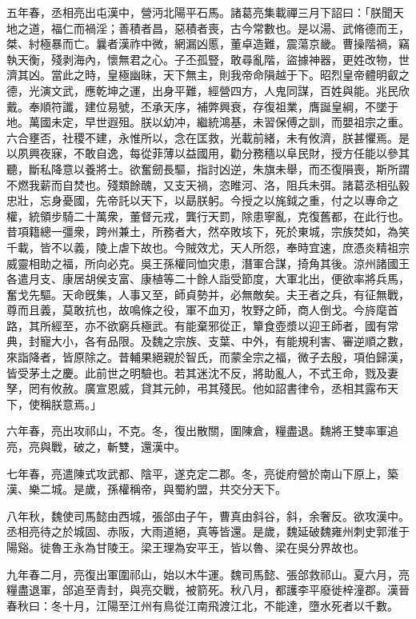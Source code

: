 \begin{pinyinscope}
五年春，丞相亮出屯漢中，營沔北陽平石馬。諸葛亮集載禪三月下詔曰：「朕聞天地之道，福仁而禍淫；善積者昌，惡積者喪，古今常數也。是以湯、武脩德而王，桀、紂極暴而亡。曩者漢祚中微，網漏凶慝，董卓造難，震蕩京畿。曹操階禍，竊執天衡，殘剥海內，懷無君之心。子丕孤豎，敢尋亂階，盜據神器，更姓改物，世濟其凶。當此之時，皇極幽昧，天下無主，則我帝命隕越于下。昭烈皇帝體明叡之德，光演文武，應乾坤之運，出身平難，經營四方，人鬼同謀，百姓與能。兆民欣戴。奉順符讖，建位易號，丕承天序，補弊興衰，存復祖業，膺誕皇綱，不墜于地。萬國未定，早世遐殂。朕以幼冲，繼統鴻基，未習保傅之訓，而嬰祖宗之重。六合壅否，社稷不建，永惟所以，念在匡救，光載前緒，未有攸濟，朕甚懼焉。是以夙興夜寐，不敢自逸，每從菲薄以益國用，勸分務穡以阜民財，授方任能以參其聽，斷私降意以養將士。欲奮劒長驅，指討凶逆，朱旗未舉，而丕復隕喪，斯所謂不燃我薪而自焚也。殘類餘醜，又支天禍，恣睢河、洛，阻兵未弭。諸葛丞相弘毅忠壯，忘身憂國，先帝託以天下，以勗朕躬。今授之以旄鉞之重，付之以專命之權，統領步騎二十萬衆，董督元戎，龔行天罰，除患寧亂，克復舊都，在此行也。昔項籍總一彊衆，跨州兼土，所務者大，然卒敗垓下，死於東城，宗族焚如，為笑千載，皆不以義，陵上虐下故也。今賊效尤，天人所怨，奉時宜速，庶憑炎精祖宗威靈相助之福，所向必克。吳王孫權同恤灾患，潛軍合謀，掎角其後。涼州諸國王各遣月支、康居胡侯支富、康植等二十餘人詣受節度，大軍北出，便欲率將兵馬，奮戈先驅。天命旣集，人事又至，師貞勢并，必無敵矣。夫王者之兵，有征無戰，尊而且義，莫敢抗也，故鳴條之役，軍不血刃，牧野之師，商人倒戈。今旍麾首路，其所經至，亦不欲窮兵極武。有能棄邪從正，簞食壺漿以迎王師者，國有常典，封寵大小，各有品限。及魏之宗族、支葉、中外，有能規利害、審逆順之數，來詣降者，皆原除之。昔輔果絕親於智氏，而蒙全宗之福，微子去殷，項伯歸漢，皆受茅土之慶。此前世之明驗也。若其迷沈不反，將助亂人，不式王命，戮及妻孥，罔有攸赦。廣宣恩威，貸其元帥，弔其殘民。他如詔書律令，丞相其露布天下，使稱朕意焉。」

六年春，亮出攻祁山，不克。冬，復出散關，圍陳倉，糧盡退。魏將王雙率軍追亮，亮與戰，破之，斬雙，還漢中。

七年春，亮遣陳式攻武都、陰平，遂克定二郡。冬，亮徙府營於南山下原上，築漢、樂二城。是歲，孫權稱帝，與蜀約盟，共交分天下。

八年秋，魏使司馬懿由西城，張郃由子午，曹真由斜谷，斜，余奢反。欲攻漢中。丞相亮待之於城固、赤阪，大雨道絕，真等皆還。是歲，魏延破魏雍州刺史郭淮于陽谿。徙魯王永為甘陵王。梁王理為安平王，皆以魯、梁在吳分界故也。

九年春二月，亮復出軍圍祁山，始以木牛運。魏司馬懿、張郃救祁山。夏六月，亮糧盡退軍，郃追至青封，與亮交戰，被箭死。秋八月，都護李平廢徙梓潼郡。漢晉春秋曰：冬十月，江陽至江州有鳥從江南飛渡江北，不能達，墮水死者以千數。


\end{pinyinscope}
